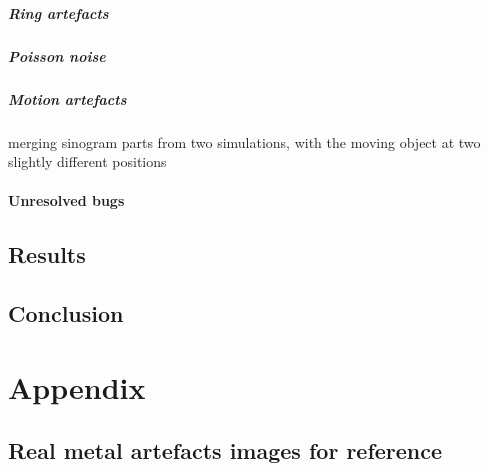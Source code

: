 \subsubsection{Ring artefacts}
\subsubsection{Poisson noise}
\subsubsection{Motion artefacts}
merging sinogram parts from two simulations, with the moving object at two slightly different positions\cite{deMan}
\subsection{Unresolved bugs}

\chapter{Results}

\chapter{Conclusion}




%
%
\part*{Appendix}

\appendix %
\chapter{Real metal artefacts images for reference}
\label{chapter:RealMetal}

